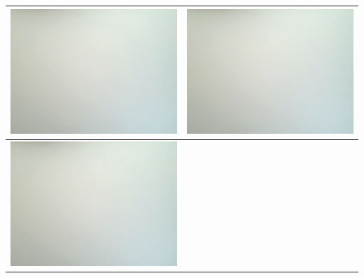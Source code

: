 \begin{tabular}{|c|c|}
 \\ 
\hline 
\includegraphics[scale=0.27]{weissbilder/weissbild_6.png}
 & 
\includegraphics[scale=0.27]{weissbilder/weissbild_7.png}
 \\ 
\hline 
\includegraphics[scale=0.27]{weissbilder/weissbild_8.png}

\end{tabular}
